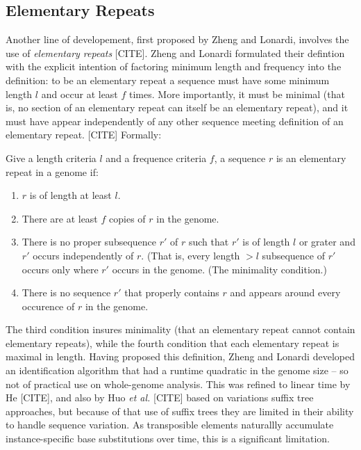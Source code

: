 \documentclass{bmcart}
\begin{document}
\subsection*{Elementary Repeats}
Another line of developement, first proposed by Zheng and Lonardi,
involves the use of {\it elementary repeats} [CITE].  
Zheng and Lonardi formulated their defintion with the explicit intention of factoring minimum length and
frequency into the definition: to be an elementary repeat a sequence
must have some minimum length $l$ and occur at least $f$ times.  More
importantly, it must be minimal (that is, no section of an elementary
repeat can itself be an elementary repeat), and it must have appear
independently of any other sequence meeting definition of an
elementary repeat.  [CITE]  Formally:
\begin{definition}
Give a length criteria $l$ and a frequence criteria $f$, a sequence
$r$ is an elementary repeat in a genome if:
\begin{enumerate}
\label{ZLDef}
\item $r$ is of length at least $l$.
\item There are at least $f$ copies of $r$ in the genome.
\item There is no proper subsequence $r'$ of $r$ such that $r'$ is of
  length $l$ or grater and $r'$ occurs independently of $r$.  (That
  is, every length $>l$ subsequence of $r'$ occurs only where $r'$
  occurs in the genome.  (The minimality condition.)
\item There is no sequence $r'$ that properly contains $r$ and appears
  around every occurence of $r$ in the genome.
\end{enumerate}
\end{definition}
The third condition insures minimality (that an elementary repeat
cannot contain elementary repeats), while the fourth condition that
each elementary repeat is maximal in length.  Having proposed this
definition, Zheng and Lonardi developed an identification algorithm
that had a runtime quadratic in the genome size -- so not of practical
use on whole-genome analysis.  This was refined to linear time by He [CITE],
and also by Huo {\it et al.} [CITE] based on variations suffix tree
approaches, but because of that use of suffix trees they are limited
in their ability to handle sequence variation.  As transposible
elements naturallly accumulate instance-specific base substitutions
over time, this is a significant limitation.
\end{document}
